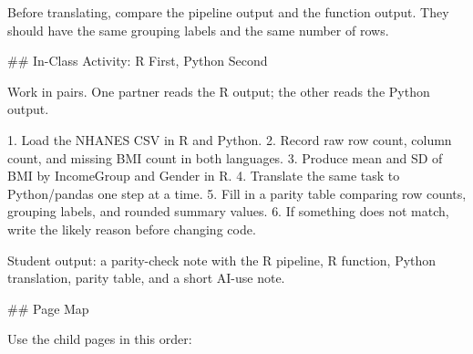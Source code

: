 \documentclass[
  letterpaper,
  DIV=11,
  numbers=noendperiod,
  oneside]{scrreprt}
\newenvironment{Shaded}{\begin{snugshade}}{\end{snugshade}}
\newcommand{\FunctionTok}[1]{\textcolor[rgb]{0.28,0.35,0.67}{#1}}
\newcommand{\InformationTok}[1]{\textcolor[rgb]{0.37,0.37,0.37}{#1}}
\newcommand{\NormalTok}[1]{\textcolor[rgb]{0.00,0.23,0.31}{#1}}
\newcommand{\SpecialStringTok}[1]{\textcolor[rgb]{0.13,0.47,0.30}{#1}}
\begin{document}
\begin{Shaded}
\begin{Highlighting}[numbers=left,,]
\NormalTok{Before translating, compare the pipeline output and the function output. They should have the same grouping labels and the same number of rows.}

\FunctionTok{\#\# In{-}Class Activity: R First, Python Second}

\NormalTok{Work in pairs. One partner reads the R output; the other reads the Python output.}

\SpecialStringTok{1. }\NormalTok{Load the NHANES CSV in R and Python.}
\SpecialStringTok{2. }\NormalTok{Record raw row count, column count, and missing }\InformationTok{\textasciigrave{}BMI\textasciigrave{}}\NormalTok{ count in both languages.}
\SpecialStringTok{3. }\NormalTok{Produce mean and SD of }\InformationTok{\textasciigrave{}BMI\textasciigrave{}}\NormalTok{ by }\InformationTok{\textasciigrave{}IncomeGroup\textasciigrave{}}\NormalTok{ and }\InformationTok{\textasciigrave{}Gender\textasciigrave{}}\NormalTok{ in R.}
\SpecialStringTok{4. }\NormalTok{Translate the same task to Python/pandas one step at a time.}
\SpecialStringTok{5. }\NormalTok{Fill in a parity table comparing row counts, grouping labels, and rounded summary values.}
\SpecialStringTok{6. }\NormalTok{If something does not match, write the likely reason before changing code.}

\NormalTok{Student output: a parity{-}check note with the R pipeline, R function, Python translation, parity table, and a short AI{-}use note.}

\FunctionTok{\#\# Page Map}

\NormalTok{Use the child pages in this order:}


\end{Highlighting}
\end{Shaded}
\end{document}
